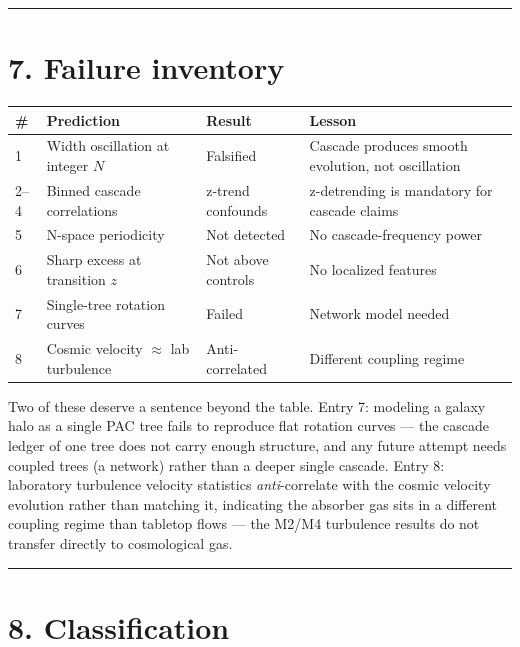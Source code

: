 \documentclass[11pt,a4paper]{article}
\begin{document}
\begin{center}\rule{0.5\linewidth}{0.4pt}\end{center}

\section*{7. Failure inventory}

\begin{longtable}[]{@{}llll@{}}
\toprule
\# & Prediction & Result & Lesson \\
\midrule\endhead
1 & Width oscillation at integer $N$ & Falsified & Cascade produces smooth evolution, not oscillation \\
2–4 & Binned cascade correlations & z-trend confounds & z-detrending is mandatory for cascade claims \\
5 & N-space periodicity & Not detected & No cascade-frequency power \\
6 & Sharp excess at transition $z$ & Not above controls & No localized features \\
7 & Single-tree rotation curves & Failed & Network model needed \\
8 & Cosmic velocity $\approx$ lab turbulence & Anti-correlated & Different coupling regime \\
\bottomrule
\end{longtable}

Two of these deserve a sentence beyond the table. Entry 7: modeling a galaxy halo as a single PAC tree fails to reproduce flat rotation curves — the cascade ledger of one tree does not carry enough structure, and any future attempt needs coupled trees (a network) rather than a deeper single cascade. Entry 8: laboratory turbulence velocity statistics \emph{anti}-correlate with the cosmic velocity evolution rather than matching it, indicating the absorber gas sits in a different coupling regime than tabletop flows — the M2/M4 turbulence results do not transfer directly to cosmological gas.

\begin{center}\rule{0.5\linewidth}{0.4pt}\end{center}

\section*{8. Classification}
\end{document}
